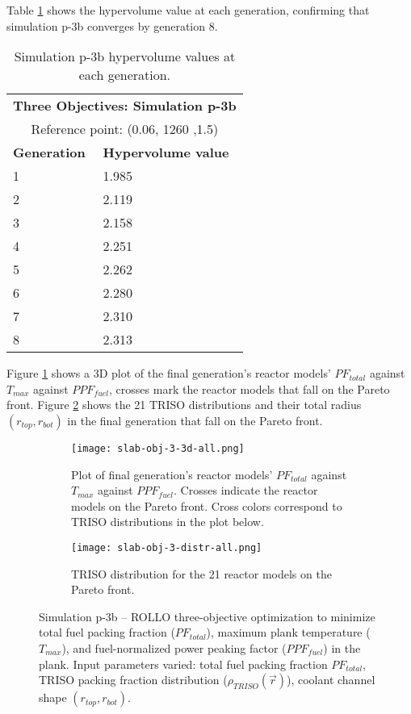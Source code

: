 Table \ref{tab:p3b-hypervolume} shows the hypervolume value at each generation, 
confirming that simulation p-3b converges by generation 8. 
\begin{table}[htbp!]
    \centering
    \onehalfspacing
    \caption{Simulation p-3b hypervolume values at each generation.}
	\label{tab:p3b-hypervolume}
    \footnotesize
    \begin{tabular}{ll}
    \hline 
    \multicolumn{2}{c}{\textbf{Three Objectives: Simulation p-3b}} \\
    \multicolumn{2}{c}{Reference point: (0.06, 1260 ,1.5)} \\
    \hline 
    \textbf{Generation} & \textbf{Hypervolume value} \\
    \hline
    1 & 1.985 \\
    2 & 2.119 \\
    3 & 2.158 \\
    4 & 2.251\\
    5 & 2.262 \\
    6 & 2.280 \\
    7 & 2.310 \\
    8 & 2.313 \\
    \hline
    \end{tabular}
\end{table}

Figure \ref{fig:slab-obj-3-3d-all} shows a 3D plot of the final generation's reactor 
models' $PF_{total}$ against $T_{max}$ against $PPF_{fuel}$, crosses mark the 
reactor models that fall on the Pareto front.
Figure \ref{fig:slab-obj-3-distr-all} shows the 21 TRISO distributions and their
total radius $(r_{top}, r_{bot})$ in the final generation that fall on the Pareto 
front. 
\begin{figure}[htbp!]
    \begin{subfigure}{\textwidth}
        \centering
        \texttt{[image: slab-obj-3-3d-all.png]}
        \caption{Plot of final generation's reactor models' $PF_{total}$ against 
        $T_{max}$ against $PPF_{fuel}$. Crosses indicate the reactor models on the 
        Pareto front. Cross colors correspond to TRISO distributions in the plot below.}
        \label{fig:slab-obj-3-3d-all} 
    \end{subfigure}
    \begin{subfigure}{\textwidth}
        \texttt{[image: slab-obj-3-distr-all.png]}
        \caption{TRISO distribution for the 21 reactor models on the Pareto front.}
        \label{fig:slab-obj-3-distr-all} 
    \end{subfigure}
    \caption{Simulation p-3b -- ROLLO three-objective optimization to minimize total 
    fuel packing fraction ($PF_{total}$), maximum plank temperature ($T_{max}$), and 
    fuel-normalized power peaking factor ($PPF_{fuel}$) in the plank. 
    Input parameters varied: total fuel packing fraction $PF_{total}$, 
    TRISO packing fraction distribution ($\rho_{TRISO}(\vec{r})$), 
    coolant channel shape $(r_{top}, r_{bot})$.}
    \label{fig:slab-obj-3-all}
\end{figure}

